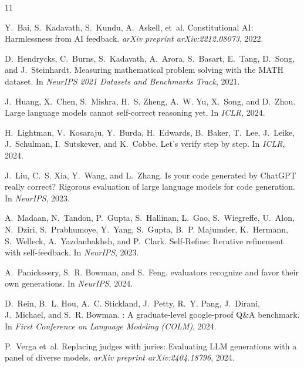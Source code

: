 \documentclass{article}
\begin{document}
\begin{thebibliography}{11}
\small

Y.~Bai, S.~Kadavath, S.~Kundu, A.~Askell, et~al.
\newblock Constitutional {AI}: Harmlessness from {AI} feedback.
\newblock \emph{arXiv preprint arXiv:2212.08073}, 2022.

D.~Hendrycks, C.~Burns, S.~Kadavath, A.~Arora, S.~Basart, E.~Tang, D.~Song, and J.~Steinhardt.
\newblock Measuring mathematical problem solving with the {MATH} dataset.
\newblock In \emph{NeurIPS 2021 Datasets and Benchmarks Track}, 2021.

J.~Huang, X.~Chen, S.~Mishra, H.~S. Zheng, A.~W. Yu, X.~Song, and D.~Zhou.
\newblock Large language models cannot self-correct reasoning yet.
\newblock In \emph{ICLR}, 2024.

H.~Lightman, V.~Kosaraju, Y.~Burda, H.~Edwards, B.~Baker, T.~Lee, J.~Leike,
  J.~Schulman, I.~Sutskever, and K.~Cobbe.
\newblock Let's verify step by step.
\newblock In \emph{ICLR}, 2024.

J.~Liu, C.~S. Xia, Y.~Wang, and L.~Zhang.
\newblock Is your code generated by {ChatGPT} really correct? {R}igorous evaluation of
  large language models for code generation.
\newblock In \emph{NeurIPS}, 2023.

A.~Madaan, N.~Tandon, P.~Gupta, S.~Hallinan, L.~Gao, S.~Wiegreffe, U.~Alon, N.~Dziri,
  S.~Prabhumoye, Y.~Yang, S.~Gupta, B.~P. Majumder, K.~Hermann, S.~Welleck,
  A.~Yazdanbakhsh, and P.~Clark.
\newblock Self-{R}efine: Iterative refinement with self-feedback.
\newblock In \emph{NeurIPS}, 2023.

A.~Panickssery, S.~R. Bowman, and S.~Feng.
 evaluators recognize and favor their own generations.
\newblock In \emph{NeurIPS}, 2024.

D.~Rein, B.~L. Hou, A.~C. Stickland, J.~Petty, R.~Y. Pang, J.~Dirani, J.~Michael,
  and S.~R. Bowman.
: A graduate-level google-proof {Q\&A} benchmark.
\newblock In \emph{First Conference on Language Modeling (COLM)}, 2024.

P.~Verga et~al.
\newblock Replacing judges with juries: Evaluating {LLM} generations with a panel of
  diverse models.
\newblock \emph{arXiv preprint arXiv:2404.18796}, 2024.


\end{thebibliography}
\end{document}
